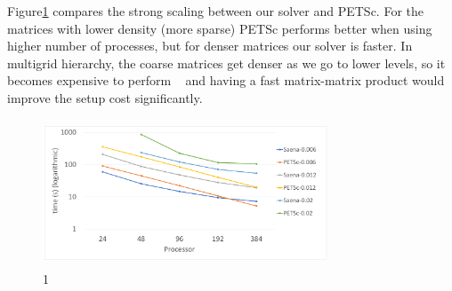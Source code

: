 Figure\ref{fig:petsc1} compares the strong scaling between our solver and PETSc. For the matrices with lower density (more sparse) PETSc performs better when using higher number of processes, but for denser matrices our solver is faster. In multigrid hierarchy, the coarse matrices get denser as we go to lower levels, so it becomes expensive to perform \mm~ and having a fast matrix-matrix product would improve the setup cost significantly.

\begin{figure}[tbh]
 \centering
 \includegraphics[width=8.5cm,height=4.4cm]{./figures/petsc1.pdf}
 \caption{1}
 \label{fig:petsc1}
\end{figure}

